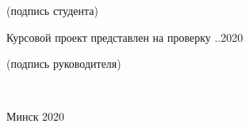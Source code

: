 \begin{titlepage}
\begin{center}
\begin{flushright}
\begin{minipage}{0.5\textwidth}
\begin{flushleft}
		  {
		    \centerline{\footnotesize{(подпись студента)}}
	      }

          Курсовой проект представлен на проверку
		  \underline{\hspace*{2em}}.\underline{\hspace*{2em}}.2020\\
		  \underline{\hspace*{8cm}}

		  {
		    \centerline{\footnotesize{(подпись руководителя)}}
	      }
        \end{flushleft}
      \end{minipage}\\[2.2em]
    \end{flushright}

        \vfill
    {\normalsize Минск 2020}
  \end{center}
\end{titlepage}
